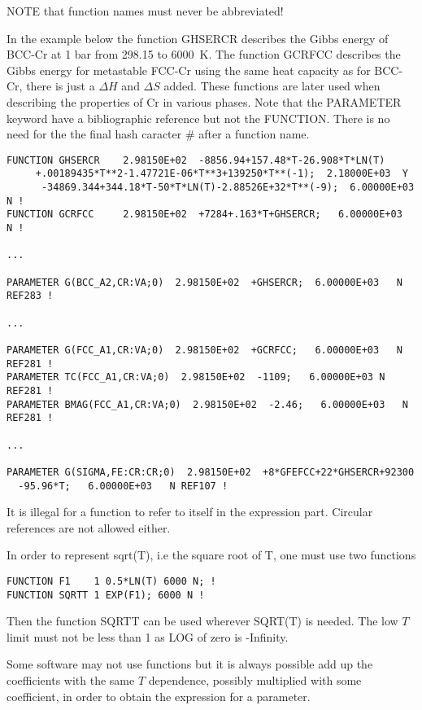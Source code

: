 \documentclass[12pt]{article}
\begin{document}
NOTE that function names must never be abbreviated!

In the example below the function GHSERCR describes the Gibbs energy
of BCC-Cr at 1 bar from 298.15 to 6000~K.  The function GCRFCC
describes the Gibbs energy for metastable FCC-Cr using the same heat
capacity as for BCC-Cr, there is just a $\Delta H$ and $\Delta S$
added.  These functions are later used when describing the properties
of Cr in various phases.  Note that the PARAMETER keyword have a
bibliographic reference but not the FUNCTION.  There is no need for the
the final hash caracter \# after a function name.

\begin{verbatim}
FUNCTION GHSERCR    2.98150E+02  -8856.94+157.48*T-26.908*T*LN(T)
     +.00189435*T**2-1.47721E-06*T**3+139250*T**(-1);  2.18000E+03  Y
      -34869.344+344.18*T-50*T*LN(T)-2.88526E+32*T**(-9);  6.00000E+03  N !
FUNCTION GCRFCC     2.98150E+02  +7284+.163*T+GHSERCR;   6.00000E+03   N !

...

PARAMETER G(BCC_A2,CR:VA;0)  2.98150E+02  +GHSERCR;  6.00000E+03   N REF283 !

...

PARAMETER G(FCC_A1,CR:VA;0)  2.98150E+02  +GCRFCC;   6.00000E+03   N REF281 !
PARAMETER TC(FCC_A1,CR:VA;0)  2.98150E+02  -1109;   6.00000E+03 N   REF281 !
PARAMETER BMAG(FCC_A1,CR:VA;0)  2.98150E+02  -2.46;   6.00000E+03   N REF281 !

...

PARAMETER G(SIGMA,FE:CR:CR;0)  2.98150E+02  +8*GFEFCC+22*GHSERCR+92300
  -95.96*T;   6.00000E+03   N REF107 !

\end{verbatim}

It is illegal for a function to refer to itself in the expression
part.  Circular references are not allowed either.

In order to represent sqrt(T), i.e the square root of T, one must use
two functions

\begin{verbatim}
FUNCTION F1    1 0.5*LN(T) 6000 N; !
FUNCTION SQRTT 1 EXP(F1); 6000 N !
\end{verbatim}

Then the function SQRTT can be used wherever SQRT(T) is needed.  The
low $T$ limit must not be less than 1 as LOG of zero is -Infinity.

Some software may not use functions but it is always possible add up
the coefficients with the same $T$ dependence, possibly multiplied
with some coefficient, in order to obtain the expression for a
parameter.
\end{document}
